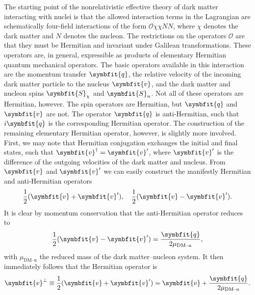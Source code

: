 \documentclass[b5paper, 10pt, twoside]{book}
\renewcommand{\vec}[1]{\symbfit{#1}}
\begin{document}
The starting point of the nonrelativistic effective theory of dark matter interacting with nuclei is that the allowed interaction terms in the Lagrangian are schematically four-field interactions of the form $\mathcal{O}\chi\chi NN$, where $\chi$ denotes the dark matter and $N$ denotes the nucleon. The restrictions on the operators $\mathcal{O}$ are that they must be Hermitian and invariant under Galilean transformations. These operators are, in general, expressible as products of elementary Hermitian quantum mechanical operators. The basic operators available in this interaction are the momentum transfer $\vec{q}$, the relative velocity of the incoming dark matter particle to the nucleus $\vec{v}$, and the dark matter and nucleon spins $\vec{S}_\chi$ and $\vec{S}_n$. Not all of these operators are Hermitian, however. The spin operators are Hermitian, but $\vec{q}$ and $\vec{v}$ are not. The operator $\vec{q}$ is anti-Hermitian, such that $i\vec{q}$ is the corresponding Hermitian operator. The construction of the remaining elementary Hermitian operator, however, is slightly more involved. First, we may note that Hermitian conjugation exchanges the initial and final states, such that $\vec{v}^\dagger=\vec{v}'$, where $\vec{v}'$ is the difference of the outgoing velocities of the dark matter and nucleus. From $\vec{v}$ and $\vec{v}'$ we can easily construct the manifestly Hermitian and anti-Hermitian operators
\begin{equation}
    \frac{1}{2}(\vec{v}+\vec{v}'),\quad\frac{1}{2}(\vec{v}-\vec{v}').
\end{equation}
It is clear by momentum conservation that the anti-Hermitian operator reduces to
\begin{equation}
    \frac{1}{2}(\vec{v}-\vec{v}')=\frac{\vec{q}}{2\mu_\text{DM--n}},
\end{equation}
with $\mu_\text{DM--n}$ the reduced mass of the dark matter--nucleon system. It then immediately follows that the Hermitian operator is
\begin{equation}
    \vec{v}^\perp\equiv\frac{1}{2}(\vec{v}+\vec{v}')=\vec{v}+\frac{\vec{q}}{2\mu_\text{DM--n}}.
\end{equation}
\end{document}
